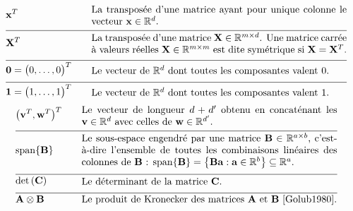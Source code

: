 \begin{align}
	&\featurevec^{T} &\quad & \parbox{.75\textwidth}{La transposée d’une matrice ayant pour unique colonne le vecteur $\featurevec \in \mathbb{R}^{\dimlocalmodel}$.} \nonumber \\[2mm] \hline \nonumber\\[-5mm]
	&\mathbf{X}^{T} &\quad & \parbox{.75\textwidth}{La transposée d’une matrice $\mathbf{X} \in \mathbb{R}^{\samplesize \times \featurelen}$. Une matrice carrée à valeurs réelles $\mathbf{X} \in \mathbb{R}^{\samplesize \times \samplesize}$ est dite symétrique si $\mathbf{X} = \mathbf{X}^{T}$.}  \nonumber \\[2mm] \hline \nonumber\\[-5mm]
	&\mathbf{0}= \big(0,\ldots,0\big)^{T}  & \quad &  \parbox{.75\textwidth}{Le vecteur de $\mathbb{R}^{\dimlocalmodel}$ dont toutes les composantes valent 0.} \nonumber \\[2mm] \hline \nonumber\\[-5mm]
	&\mathbf{1}= \big(1,\ldots,1\big)^{T}  & \quad &  \parbox{.75\textwidth}{Le vecteur de $\mathbb{R}^{\dimlocalmodel}$ dont toutes les composantes valent 1.} \nonumber
\end{align}
\newpage
\begin{align} 
	&\big(\vv^{T},\vw^{T} \big)^{T}  & \quad &  \parbox{.75\textwidth}{Le vecteur de longueur $\featurelen+\featurelen'$ obtenu en concaténant les  $\vv \in \mathbb{R}^{\featurelen}$ avec celles de $\vw \in \mathbb{R}^{\featurelen'}$.} \nonumber \\[2mm] \hline \nonumber\\[-5mm]
	&	{\rm span}\{ \mathbf{B} \}  & \quad &  \parbox{.75\textwidth}{Le sous-espace engendré par une matrice $\mathbf{B} \in \mathbb{R}^{a \times b}$, c’est-à-dire l’ensemble de toutes les combinaisons linéaires des colonnes de $\mathbf{B}$ : ${\rm span}\{ \mathbf{B} \} = \big\{  \mathbf{B} \va : \va \in \mathbb{R}^{b} \big\} \subseteq \mathbb{R}^{a}$.} \nonumber \\[2mm] \hline \nonumber\\[-5mm]
	&\determinant{\mC} &\quad & \parbox{.75\textwidth}{Le déterminant de la matrice $\mC$.} \nonumber \\[2mm] \hline \nonumber\\[-5mm]
	&\mathbf{A} \otimes \mathbf{B} &\quad & \parbox{.75\textwidth}{Le produit de Kronecker des matrices $\mathbf{A}$ et $\mathbf{B}$ \cite{Golub1980}.} \nonumber
\end{align} 

\newpage
